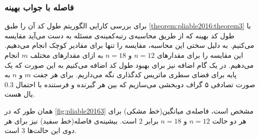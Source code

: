 \subsubsection{
    فاصله با جواب بهینه
}
برای بررسی کارایی الگوریتم
طول کد آن را طبق
\autoref{theorem:pliable2016:theorem3}
با طول کد بهینه که از طریق محاسبه‌ی رتبه‌کمینه‌ی مسئله به دست می‌آید مقایسه می‌کنیم. به دلیل سختی این محاسبه، مقایسه را تنها برای مقادیر کوچک انجام می‌دهیم. این مقایسه را برای مقدارهای
$n = 12$
و
$n = 18$
به ازای مقدارهای مختلف
$m$
انجام می‌دهیم. در
یک گام اضافه نیز برای بهبود طول کد اضافه می‌کنیم به این صورت که یک پایه برای فضای سطری ماتریس کدگذاری نگه می‌داریم. برای هر جفت
$m$
و
$n$
به صورت تصادفی ۵ گراف دوبخشی می‌سازیم که بین هر گیرنده و فرستنده با احتمال
$0.3$
یال هست.

همان طور که در
\autoref{fig:pliable20163}
مشخص است، فاصله‌ی میانگین(خط مشکی) برای هر دو حالت
$n = 12$
و
$n = 18$
برابر
$2$
است. بیشینه‌ی فاصله(خط سفید) نیز برای هر دوی این حالت‌ها
$3$
است.

